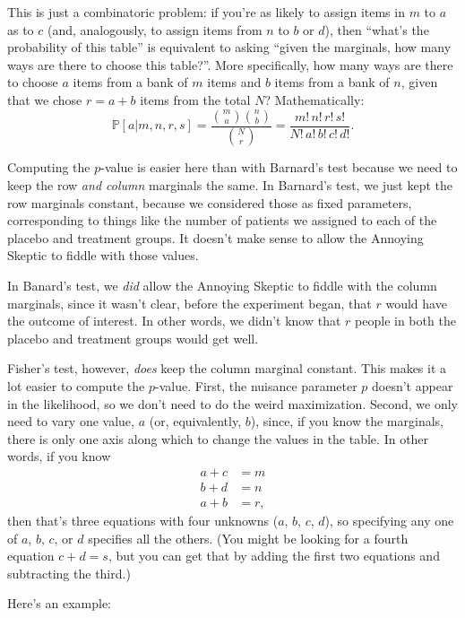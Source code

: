 \documentclass{book}
\begin{document}
This is just a combinatoric problem: if you're as likely to assign items
in \(m\) to \(a\) as to \(c\) (and, analogously, to assign items from
\(n\) to \(b\) or \(d\)), then ``what's the probability of this table''
is equivalent to asking ``given the marginals, how many ways are there
to choose this table?''. More specifically, how many ways are there to
choose \(a\) items from a bank of \(m\) items and \(b\) items from a
bank of \(n\), given that we chose \(r = a + b\) items from the total
\(N\)? Mathematically: \[
\mathbb{P}[a | m, n, r, s] = \frac{\binom{m}{a} \binom{n}{b}}{\binom{N}{r}} = \frac{m! \, n! \, r! \, s!}{N! \, a! \, b! \, c! \, d!}.
\]

Computing the \(p\)-value is easier here than with Barnard's test
because we need to keep the row \emph{and column} marginals the same. In
Barnard's test, we just kept the row marginals constant, because we
considered those as fixed parameters, corresponding to things like the
number of patients we assigned to each of the placebo and treatment
groups. It doesn't make sense to allow the Annoying Skeptic to fiddle
with those values.

In Banard's test, we \emph{did} allow the Annoying Skeptic to fiddle
with the column marginals, since it wasn't clear, before the experiment
began, that \(r\) would have the outcome of interest. In other words, we
didn't know that \(r\) people in both the placebo and treatment groups
would get well.

Fisher's test, however, \emph{does} keep the column marginal constant.
This makes it a lot easier to compute the \(p\)-value. First, the
nuisance parameter \(p\) doesn't appear in the likelihood, so we don't
need to do the weird maximization. Second, we only need to vary one
value, \(a\) (or, equivalently, \(b\)), since, if you know the
marginals, there is only one axis along which to change the values in
the table. In other words, if you know \[
\begin{aligned}
a + c &= m \\
b + d &= n \\
a + b &= r,
\end{aligned}
\] then that's three equations with four unknowns (\(a\), \(b\), \(c\),
\(d\)), so specifying any one of \(a\), \(b\), \(c\), or \(d\) specifies
all the others. (You might be looking for a fourth equation
\(c + d = s\), but you can get that by adding the first two equations
and subtracting the third.)

Here's an example:
\end{document}
